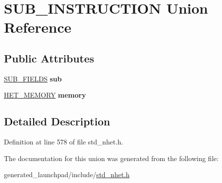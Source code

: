 \hypertarget{unionSUB__INSTRUCTION}{}\section{S\+U\+B\+\_\+\+I\+N\+S\+T\+R\+U\+C\+T\+I\+ON Union Reference}
\label{unionSUB__INSTRUCTION}
\subsection*{Public Attributes}
\begin{DoxyCompactItemize}
\item 
\mbox{\label{unionSUB__INSTRUCTION_a324ea43c874f499a3f195e8a27c9a45c}} 
\mbox{\hyperlink{structSUB__format}{S\+U\+B\+\_\+\+F\+I\+E\+L\+DS}} {\bfseries sub}
\item 
\mbox{\label{unionSUB__INSTRUCTION_aa165d7d63ba986c2030c7a3b34afcf64}} 
\mbox{\hyperlink{structmemory__format}{H\+E\+T\+\_\+\+M\+E\+M\+O\+RY}} {\bfseries memory}
\end{DoxyCompactItemize}


\subsection{Detailed Description}


Definition at line 578 of file std\+\_\+nhet.\+h.



The documentation for this union was generated from the following file\+:\begin{DoxyCompactItemize}
\item 
generated\+\_\+launchpad/include/\mbox{\hyperlink{std__nhet_8h}{std\+\_\+nhet.\+h}}\end{DoxyCompactItemize}
